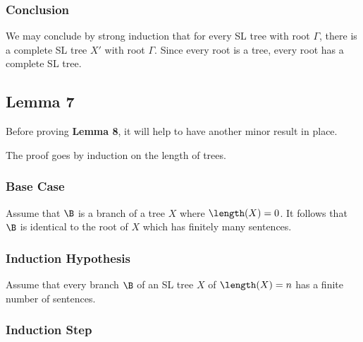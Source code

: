 \subsubsection{Conclusion}

We may conclude by strong induction that for every SL tree with root $\Gamma$, there is a complete SL tree $X'$ with root $\Gamma$. 
Since every root is a tree, every root has a complete SL tree.





\subsection{Lemma 7}

Before proving \textbf{Lemma 8}, it will help to have another minor result in place.

\label{FiniteLengthLemma}

The proof goes by induction on the length of trees.

\subsubsection{Base Case}

Assume that $\B$ is a branch of a tree $X$ where $\length(X)=0$. 
It follows that $\B$ is identical to the root of $X$ which has finitely many sentences. 

\subsubsection{Induction Hypothesis}

Assume that every branch $\B$ of an SL tree $X$ of $\length(X)=n$ has a finite number of sentences.

\subsubsection{Induction Step}

